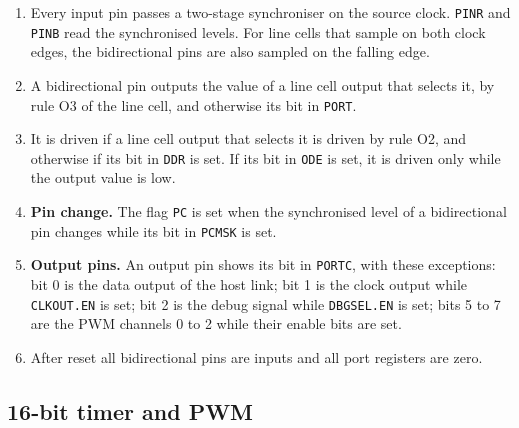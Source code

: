 \documentclass[10pt,a4paper]{article}
\newcommand{\reg}[1]{\texttt{#1}}
\begin{document}
\begin{enumerate}[label=\textbf{A\arabic*},leftmargin=2.6em]
\item Every input pin passes a two-stage synchroniser on the source clock. \reg{PINR} and \reg{PINB} read the
synchronised levels. For line cells that sample on both clock edges, the bidirectional pins are also sampled on
the falling edge.
\item A bidirectional pin outputs the value of a line cell output that selects it, by rule O3 of the line cell, and
otherwise its bit in \reg{PORT}.
\item It is driven if a line cell output that selects it is driven by rule O2, and otherwise if its bit in
\reg{DDR} is set. If its bit in \reg{ODE} is set, it is driven only while the output value is low.
\item \textbf{Pin change.} The flag \reg{PC} is set when the synchronised level of a bidirectional pin changes
while its bit in \reg{PCMSK} is set.
\item \textbf{Output pins.} An output pin shows its bit in \reg{PORTC}, with these exceptions: bit 0 is the data
output of the host link; bit 1 is the clock output while \reg{CLKOUT.EN} is set; bit 2 is the debug signal while
\reg{DBGSEL.EN} is set; bits 5 to 7 are the PWM channels 0 to 2 while their enable bits are set.
\item After reset all bidirectional pins are inputs and all port registers are zero.
\end{enumerate}

\subsection{16-bit timer and PWM}
\end{document}

